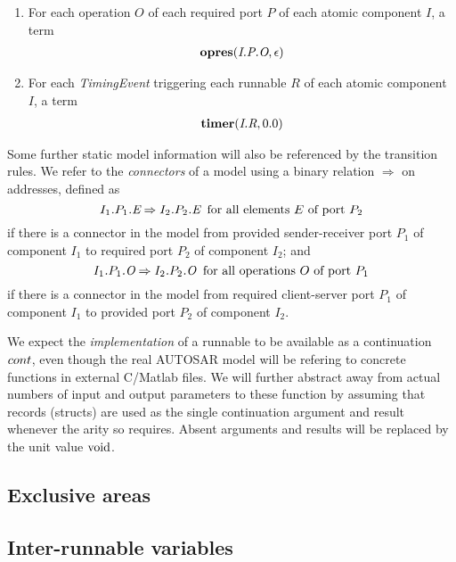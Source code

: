 \documentclass[twocolumn]{article}
\begin{document}
\begin{enumerate}
\item For each operation $O$ of each required port $P$ of each atomic component $I$, a term
\[
\begin{array}{c}
  \Topres{\Tep{O}{P}{I}}{\epsilon}
\end{array}
\]

\item For each \emph{TimingEvent} triggering each runnable $R$ of each atomic component $I$, a term
\[
\begin{array}{c}
  \Ttimer{\Tr{R}{I}}{0.0}
\end{array}
\]

\end{enumerate}

Some further static model information will also be referenced by the transition rules. We refer to the \emph{connectors} of a model using a binary relation $\Rightarrow$ on addresses, defined as
\[
  \Tconnect{\Tep{E}{$P_1$}{$I_1$}}{\Tep{E}{$P_2$}{$I_2$}} \;\;\text{for all elements $E$ of port $P_2$}
\]
if there is a connector in the model from provided sender-receiver port $P_1$ of component $I_1$ to required port $P_2$ of component $I_2$; and
\[
  \Tconnect{\Top{O}{$P_1$}{$I_1$}}{\Top{O}{$P_2$}{$I_2$}} \;\;\text{for all operations $O$ of port $P_1$}
\]
if there is a connector in the model from required client-server port $P_1$ of component $I_1$ to provided port $P_2$ of component $I_2$.

We expect the \emph{implementation} of a runnable to be available as a continuation $\Cont$, even though the real AUTOSAR model will be refering to concrete functions in external C/Matlab files. We will further abstract away from actual numbers of input and output parameters to these function by assuming that records (structs) are used as the single continuation argument and result whenever the arity so requires. Absent arguments and results will be replaced by the unit value $\Tvoid$.

\subsection{Exclusive areas}


\subsection{Inter-runnable variables}
\end{document}
